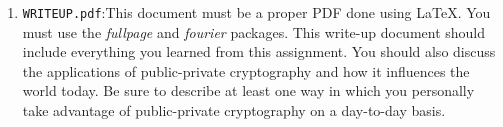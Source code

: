\begin{enumerate}
\item
	\texttt{WRITEUP.pdf}:This document must be a proper PDF
	done using \LaTeX. You must use
                the \emph{fullpage} and \emph{fourier} packages.
                This write-up
	document should include everything you learned from this
	assignment. You should also discuss the applications of
	public-private cryptography and how it influences the world
	today. Be sure to describe at least one way in which you
	personally take advantage of public-private cryptography on a day-to-day basis.

\end{enumerate}
